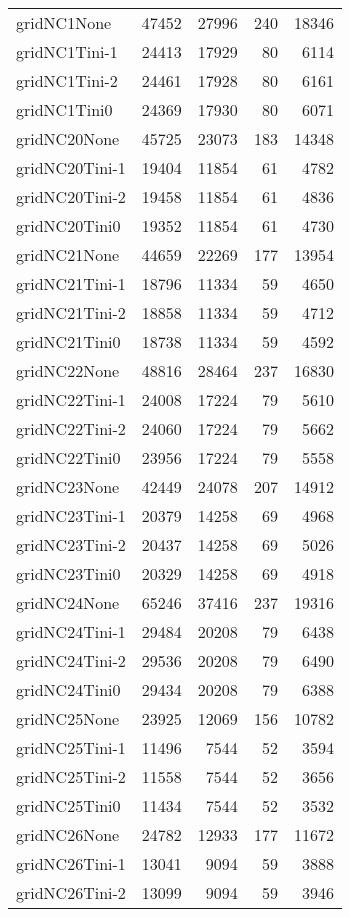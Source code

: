 \begin{longtable}{lrrrr}
gridNC1None & 47452 & 27996 & 240 & 18346 \\
gridNC1Tini-1 & 24413 & 17929 & 80 & 6114 \\
gridNC1Tini-2 & 24461 & 17928 & 80 & 6161 \\
gridNC1Tini0 & 24369 & 17930 & 80 & 6071 \\
gridNC20None & 45725 & 23073 & 183 & 14348 \\
gridNC20Tini-1 & 19404 & 11854 & 61 & 4782 \\
gridNC20Tini-2 & 19458 & 11854 & 61 & 4836 \\
gridNC20Tini0 & 19352 & 11854 & 61 & 4730 \\
gridNC21None & 44659 & 22269 & 177 & 13954 \\
gridNC21Tini-1 & 18796 & 11334 & 59 & 4650 \\
gridNC21Tini-2 & 18858 & 11334 & 59 & 4712 \\
gridNC21Tini0 & 18738 & 11334 & 59 & 4592 \\
gridNC22None & 48816 & 28464 & 237 & 16830 \\
gridNC22Tini-1 & 24008 & 17224 & 79 & 5610 \\
gridNC22Tini-2 & 24060 & 17224 & 79 & 5662 \\
gridNC22Tini0 & 23956 & 17224 & 79 & 5558 \\
gridNC23None & 42449 & 24078 & 207 & 14912 \\
gridNC23Tini-1 & 20379 & 14258 & 69 & 4968 \\
gridNC23Tini-2 & 20437 & 14258 & 69 & 5026 \\
gridNC23Tini0 & 20329 & 14258 & 69 & 4918 \\
gridNC24None & 65246 & 37416 & 237 & 19316 \\
gridNC24Tini-1 & 29484 & 20208 & 79 & 6438 \\
gridNC24Tini-2 & 29536 & 20208 & 79 & 6490 \\
gridNC24Tini0 & 29434 & 20208 & 79 & 6388 \\
gridNC25None & 23925 & 12069 & 156 & 10782 \\
gridNC25Tini-1 & 11496 & 7544 & 52 & 3594 \\
gridNC25Tini-2 & 11558 & 7544 & 52 & 3656 \\
gridNC25Tini0 & 11434 & 7544 & 52 & 3532 \\
gridNC26None & 24782 & 12933 & 177 & 11672 \\
gridNC26Tini-1 & 13041 & 9094 & 59 & 3888 \\
gridNC26Tini-2 & 13099 & 9094 & 59 & 3946 \\

\end{longtable}
